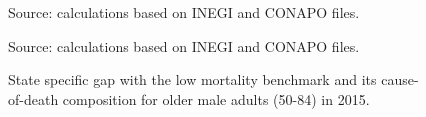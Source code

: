 \documentclass{bmcart}
\begin{document}
\begin{backmatter}
\begin{figure}[h!]
Source: calculations based on INEGI and CONAPO files. 
\end{figure}


\begin{figure}[h!]
\centering
\caption{State specific gap with the low mortality benchmark and its cause-of-death composition for older male adults (50-84) in 2015.}

\label{Fig5}

Source: calculations based on INEGI and CONAPO files. 
\end{figure}




\end{backmatter}
\end{document}
